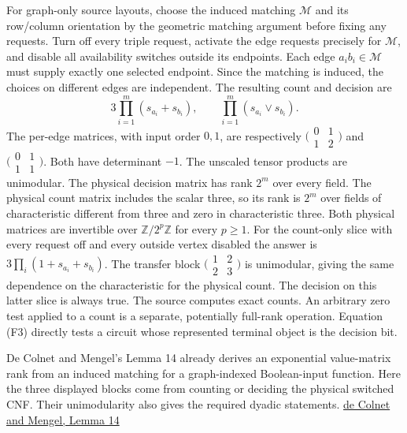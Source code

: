 \documentclass[
  11pt,
]{article}
\begin{document}
For graph-only source layouts, choose the induced matching
\(\mathcal M\) and its row/column orientation by the geometric matching
argument before fixing any requests. Turn off every triple request,
activate the edge requests precisely for \(\mathcal M\), and disable all
availability switches outside its endpoints. Each edge
\(a_ib_i\in\mathcal M\) must supply exactly one selected endpoint. Since
the matching is induced, the choices on different edges are independent.
The resulting count and decision are \[
 3\prod_{i=1}^{m}(s_{a_i}+s_{b_i}),\qquad
 \prod_{i=1}^{m}(s_{a_i}\lor s_{b_i}).
 \tag{F3}
\] The per-edge matrices, with input order \(0,1\), are respectively
\(\bigl(\begin{smallmatrix}0&1\\1&2\end{smallmatrix}\bigr)\) and
\(\bigl(\begin{smallmatrix}0&1\\1&1\end{smallmatrix}\bigr)\). Both have
determinant \(-1\). The unscaled tensor products are unimodular. The
physical decision matrix has rank \(2^m\) over every field. The physical
count matrix includes the scalar three, so its rank is \(2^m\) over
fields of characteristic different from three and zero in characteristic
three. Both physical matrices are invertible over
\(\mathbb Z/2^p\mathbb Z\) for every \(p\ge1\). For the count-only slice
with every request off and every outside vertex disabled the answer is
\(3\prod_i(1+s_{a_i}+s_{b_i})\). The transfer block
\(\bigl(\begin{smallmatrix}1&2\\2&3\end{smallmatrix}\bigr)\) is
unimodular, giving the same dependence on the characteristic for the
physical count. The decision on this latter slice is always true. The
source computes exact counts. An arbitrary zero test applied to a count
is a separate, potentially full-rank operation. Equation (F3) directly
tests a circuit whose represented terminal object is the decision bit.

De Colnet and Mengel's Lemma 14 already derives an exponential
value-matrix rank from an induced matching for a graph-indexed
Boolean-input function. Here the three displayed blocks come from
counting or deciding the physical switched CNF. Their unimodularity also
gives the required dyadic statements.
\href{https://proceedings.kr.org/2021/20/kr2021-0020-de-colnet-et-al.pdf}{de
Colnet and Mengel, Lemma 14}
\end{document}
